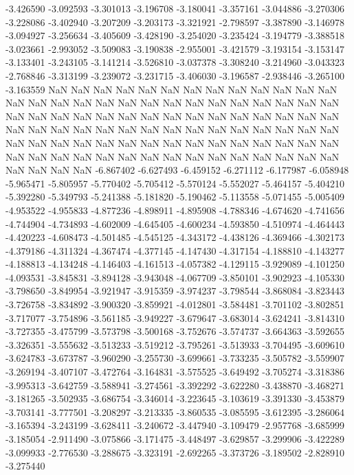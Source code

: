 -3.426590
-3.092593
-3.301013
-3.196708
-3.180041
-3.357161
-3.044886
-3.270306
-3.228086
-3.402940
-3.207209
-3.203173
-3.321921
-2.798597
-3.387890
-3.146978
-3.094927
-3.256634
-3.405609
-3.428190
-3.254020
-3.235424
-3.194779
-3.388518
-3.023661
-2.993052
-3.509083
-3.190838
-2.955001
-3.421579
-3.193154
-3.153147
-3.133401
-3.243105
-3.141214
-3.526810
-3.037378
-3.308240
-3.214960
-3.043323
-2.768846
-3.313199
-3.239072
-3.231715
-3.406030
-3.196587
-2.938446
-3.265100
-3.163559
NaN
NaN
NaN
NaN
NaN
NaN
NaN
NaN
NaN
NaN
NaN
NaN
NaN
NaN
NaN
NaN
NaN
NaN
NaN
NaN
NaN
NaN
NaN
NaN
NaN
NaN
NaN
NaN
NaN
NaN
NaN
NaN
NaN
NaN
NaN
NaN
NaN
NaN
NaN
NaN
NaN
NaN
NaN
NaN
NaN
NaN
NaN
NaN
NaN
NaN
NaN
NaN
NaN
NaN
NaN
NaN
NaN
NaN
NaN
NaN
NaN
NaN
NaN
NaN
NaN
NaN
NaN
NaN
NaN
NaN
NaN
NaN
NaN
NaN
NaN
NaN
NaN
NaN
NaN
NaN
NaN
NaN
NaN
NaN
NaN
NaN
NaN
NaN
NaN
NaN
NaN
NaN
-6.867402
-6.627493
-6.459152
-6.271112
-6.177987
-6.058948
-5.965471
-5.805957
-5.770402
-5.705412
-5.570124
-5.552027
-5.464157
-5.404210
-5.392280
-5.349793
-5.241388
-5.181820
-5.190462
-5.113558
-5.071455
-5.005409
-4.953522
-4.955833
-4.877236
-4.898911
-4.895908
-4.788346
-4.674620
-4.741656
-4.744904
-4.734893
-4.602009
-4.645405
-4.600234
-4.593850
-4.510974
-4.464443
-4.420223
-4.608473
-4.501485
-4.545125
-4.343172
-4.438126
-4.369466
-4.302173
-4.379186
-4.311324
-4.367474
-4.377145
-4.147430
-4.317154
-4.188810
-4.143277
-4.188813
-4.134248
-4.146403
-4.161513
-4.057382
-4.129115
-3.929089
-4.101250
-4.093531
-3.845831
-3.894128
-3.943048
-4.067709
-3.850101
-3.902923
-4.105330
-3.798650
-3.849954
-3.921947
-3.915359
-3.974237
-3.798544
-3.868084
-3.823443
-3.726758
-3.834892
-3.900320
-3.859921
-4.012801
-3.584481
-3.701102
-3.802851
-3.717077
-3.754896
-3.561185
-3.949227
-3.679647
-3.683014
-3.624241
-3.814310
-3.727355
-3.475799
-3.573798
-3.500168
-3.752676
-3.574737
-3.664363
-3.592655
-3.326351
-3.555632
-3.513233
-3.519212
-3.795261
-3.513933
-3.704495
-3.609610
-3.624783
-3.673787
-3.960290
-3.255730
-3.699661
-3.733235
-3.505782
-3.559907
-3.269194
-3.407107
-3.472764
-3.164831
-3.575525
-3.649492
-3.705274
-3.318386
-3.995313
-3.642759
-3.588941
-3.274561
-3.392292
-3.622280
-3.438870
-3.468271
-3.181265
-3.502935
-3.686754
-3.346014
-3.223645
-3.103619
-3.391330
-3.453879
-3.703141
-3.777501
-3.208297
-3.213335
-3.860535
-3.085595
-3.612395
-3.286064
-3.165394
-3.243199
-3.628411
-3.240672
-3.447940
-3.109479
-2.957768
-3.685999
-3.185054
-2.911490
-3.075866
-3.171475
-3.448497
-3.629857
-3.299906
-3.422289
-3.099933
-2.776530
-3.288675
-3.323191
-2.692265
-3.373726
-3.189502
-2.828910
-3.275440

